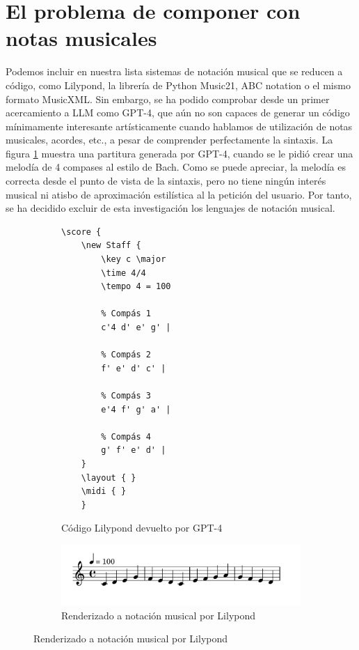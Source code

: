     
\section{El problema de componer con notas musicales}

Podemos incluir en nuestra lista sistemas de notación musical que se reducen a código, como Lilypond, la librería de Python Music21, ABC notation o el mismo formato MusicXML. Sin embargo, se ha podido comprobar desde un primer acercamiento a LLM como GPT-4, que aún no son capaces de generar un código mínimamente interesante artísticamente cuando hablamos de utilización de notas musicales, acordes, etc., a pesar de comprender perfectamente la sintaxis. La figura \ref{fig:melodia_bach} muestra una partitura generada por GPT-4, cuando se le pidió crear una melodía de 4 compases al estilo de Bach. Como se puede apreciar, la melodía es correcta desde el punto de vista de la sintaxis, pero no tiene ningún interés musical ni atisbo de aproximación estilística al la petición del usuario. Por tanto, se ha decidido excluir de esta investigación los lenguajes de notación musical.

\begin{figure}[h]
    \caption[Melodía de 4 compases generada por GPT-4, al estilo de Bach]{Melodía de 4 compases generada por GPT-4, al estilo de Bach. El LLM la entregó en formato Lilypond.}
    \centering
    \begin{subfigure}{.48\textwidth}
        \centering
        \begin{mdframed}
        \begin{verbatim}
\score {
    \new Staff {
        \key c \major
        \time 4/4
        \tempo 4 = 100
    
        % Compás 1
        c'4 d' e' g' |
    
        % Compás 2
        f' e' d' c' |
    
        % Compás 3
        e'4 f' g' a' |
    
        % Compás 4
        g' f' e' d' |
    }
    \layout { }
    \midi { }
    }
        \end{verbatim}
        \end{mdframed}
        \caption{Código Lilypond devuelto por GPT-4}
      \end{subfigure} \hfill

      \vspace{5mm} %

      \begin{subfigure}{.75\textwidth}
        \centering
        \includegraphics[width=1\textwidth]{./figuras/melodia_bach_estilo.png}
        \caption{Renderizado a notación musical por Lilypond}
      \end{subfigure}\hfill
    \label{fig:melodia_bach}
\end{figure}

